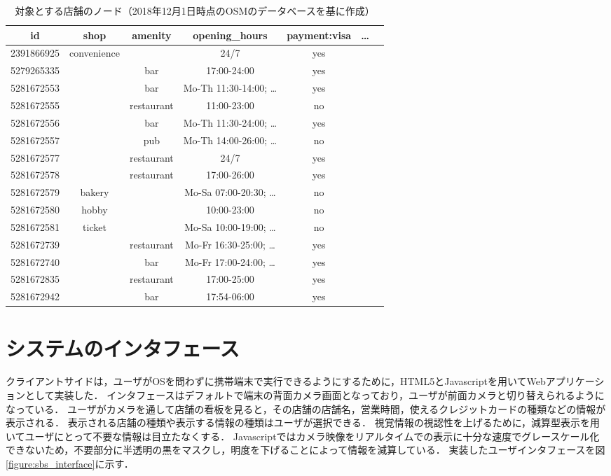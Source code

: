 \begin{table}[tb]
    \caption{対象とする店舗のノード（2018年12月1日時点のOSMのデータベースを基に作成）}
    \label{table:storelist}
    \begin{center}
      \begin{tabular}{c|cccccc}
        \hline\hline
        \textbf{id} & \textbf{shop} & \textbf{amenity} & \textbf{opening\_hours} & \textbf{payment:visa} & \textbf{\ldots} \\ 
        \hline
        2391866925 & convenience & & 24/7 & yes & \\
        5279265335 & & bar & 17:00-24:00 & yes & \\
        5281672553 & & bar & Mo-Th 11:30-14:00; \ldots & yes & \\
        5281672555 & & restaurant & 11:00-23:00 & no & \\
        5281672556 & & bar & Mo-Th 11:30-24:00; \ldots & yes & \\
        5281672557 & & pub & Mo-Th 14:00-26:00; \ldots & no & \\
        5281672577 & & restaurant & 24/7 & yes & \\
        5281672578 & & restaurant & 17:00-26:00 & yes & \\
        5281672579 & bakery & & Mo-Sa 07:00-20:30; \ldots & no & \\
        5281672580 & hobby & & 10:00-23:00 & no & \\
        5281672581 & ticket & & Mo-Sa 10:00-19:00; \ldots & no & \\
        5281672739 & & restaurant & Mo-Fr 16:30-25:00; \ldots & yes & \\
        5281672740 & & bar & Mo-Fr 17:00-24:00; \ldots & yes & \\
        5281672835 & & restaurant & 17:00-25:00 & yes & \\
        5281672942 & & bar & 17:54-06:00 & yes & \\
        \hline
      \end{tabular}
    \end{center}


  \end{table}


\section{システムのインタフェース}
  クライアントサイドは，ユーザがOSを問わずに携帯端末で実行できるようにするために，HTML5とJavascriptを用いてWebアプリケーションとして実装した．
  インタフェースはデフォルトで端末の背面カメラ画面となっており，ユーザが前面カメラと切り替えられるようになっている．
  ユーザがカメラを通して店舗の看板を見ると，その店舗の店舗名，営業時間，使えるクレジットカードの種類などの情報が表示される．
  表示される店舗の種類や表示する情報の種類はユーザが選択できる．
  視覚情報の視認性を上げるために，減算型表示を用いてユーザにとって不要な情報は目立たなくする．
  Javascriptではカメラ映像をリアルタイムでの表示に十分な速度でグレースケール化できないため，不要部分に半透明の黒をマスクし，明度を下げることによって情報を減算している．
  実装したユーザインタフェースを図\ref{figure:sbs_interface}に示す．


